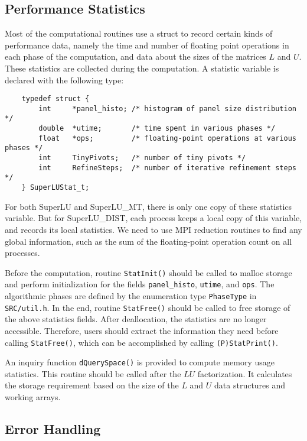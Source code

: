 \subsection{Performance Statistics}

Most of the computational routines use a struct to record certain
kinds of performance data, namely the time and number of floating point
operations in each phase of the computation, and data about the sizes
of the matrices $L$ and $U$. These statistics are collected
during the computation.
A statistic variable is declared with the following type:
\begin{verbatim}
    typedef struct {
        int     *panel_histo; /* histogram of panel size distribution */
        double  *utime;       /* time spent in various phases */
        float   *ops;         /* floating-point operations at various phases */
        int     TinyPivots;   /* number of tiny pivots */
        int     RefineSteps;  /* number of iterative refinement steps */
    } SuperLUStat_t;
\end{verbatim}

For both SuperLU and SuperLU\_MT, there is only one copy of these
statistics variable. But for SuperLU\_DIST, each process
keeps a local copy of this variable, and records its local
statistics. We need to use MPI reduction routines to
find any global information, such as the sum of the floating-point operation
count on all processes.

Before the computation, routine {\tt StatInit()} should be called to malloc
storage and perform initialization for the fields {\tt panel\_histo},
{\tt utime}, and {\tt ops}. The algorithmic phases are defined by the
enumeration type {\tt PhaseType} in {\tt SRC/util.h}.
In the end, routine {\tt StatFree()} should be called to free storage of
the above statistics fields.
After deallocation, the statistics are no longer accessible. Therefore,
users should extract the information they need before calling {\tt StatFree()},
which can be accomplished by calling {\tt (P)StatPrint()}.

An inquiry function {\tt dQuerySpace()} is provided to compute
memory usage statistics. This routine should be called after
the $LU$ factorization. It calculates the storage requirement based on
the size of the $L$ and $U$ data structures and working arrays.


\subsection{Error Handling}
\label{sec:SuperLU_ErrorHandling}
